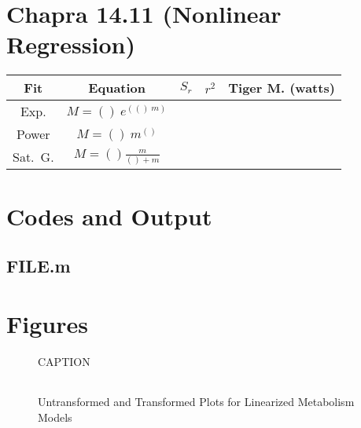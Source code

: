 \documentclass{article}
\begin{document}
\section{Chapra 14.11 (Nonlinear Regression)}
\begin{center}
\begin{tabular}{|c|c|c|c|c|}\hline 
Fit & Equation & $S_r$ & $r^2$ & Tiger M. (watts) \\\hline 
Exp.    & $M=()~e^{(()~m)}$    & ~ &  &  \\\hline 
Power   & $M=()~m^{()}$         & ~ &  &  \\\hline 
Sat.~G. & $M=()\frac{m}{()+m}$ & ~ &  &  \\\hline 
\end{tabular}
\end{center}

 
\pagebreak
\appendix
\section{Codes and Output}

\subsection{FILE.m}
\pagebreak

\section{Figures}
\begin{figure}[h!]
\begin{center}
\caption{CAPTION}
\end{center}
\end{figure}

\begin{sidewaysfigure}[h!]
\begin{center}
\begin{tabular}{ccc}
\end{tabular}
\end{center}
\caption{Untransformed and Transformed Plots for Linearized Metabolism Models}
\end{sidewaysfigure}
\end{document}
